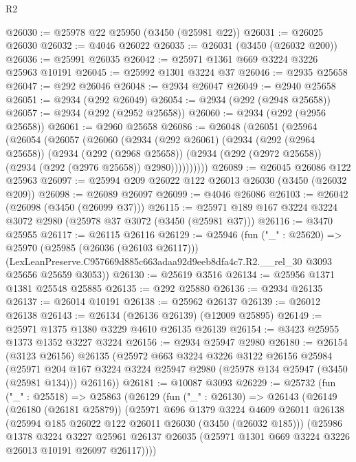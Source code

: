 \begin{lexlean}{R2}
\begin{coremodule}
@26030 := @25978 @22 @25950 (@3450 (@25981 @22))
@26031 := @26025 @26030
@26032 := @4046 @26022
@26035 := @26031 (@3450 (@26032 @200))
@26036 := @25991 @26035
@26042 := @25971 @1361 @669 @3224 @3226 @25963 @10191
@26045 := @25992 @1301 @3224 @37
@26046 := @2935 @25658
@26047 := @292 @26046
@26048 := @2934 @26047
@26049 := @2940 @25658
@26051 := @2934 (@292 @26049)
@26054 := @2934 (@292 (@2948 @25658))
@26057 := @2934 (@292 (@2952 @25658))
@26060 := @2934 (@292 (@2956 @25658))
@26061 := @2960 @25658
@26086 := @26048
    (@26051
      (@25964
        (@26054
          (@26057
            (@26060
              (@2934
                (@292 @26061)
                (@2934
                  (@292 (@2964 @25658))
                  (@2934
                    (@292 (@2968 @25658))
                    (@2934 (@292 (@2972 @25658)) (@2934 (@292 (@2976 @25658)) @2980))))))))))
@26089 := @26045 @26086 @122 @25963
@26097 := @25994 @209 @26022 @122 @26013 @26030 (@3450 (@26032 @209))
@26098 := @26089 @26097
@26099 := @4046 @26086
@26103 := @26042 (@26098 (@3450 (@26099 @37)))
@26115 := @25971 @189 @167 @3224 @3224 @3072 @2980 (@25978 @37 @3072 (@3450 (@25981 @37)))
@26116 := @3470 @25955
@26117 := @26115 @26116
@26129 := @25946
    (fun ("_" : @25620) =>
    @25970
      (@25985 (@26036 (@26103 @26117)))
      (LexLeanPreserve.C957669d885c663adaa92d9eeb8dfa4c7.R2.__rel_30 @3093 @25656 @25659 @3053))
@26130 := @25619 @3516
@26134 := @25956 @1371 @1381 @25548 @25885
@26135 := @292 @25880
@26136 := @2934 @26135
@26137 := @26014 @10191
@26138 := @25962 @26137
@26139 := @26012 @26138
@26143 := @26134 (@26136 @26139) (@12009 @25895)
@26149 := @25971 @1375 @1380 @3229 @4610 @26135 @26139
@26154 := @3423 @25955 @1373 @1352 @3227 @3224
@26156 := @2934 @25947 @2980
@26180 := @26154
    (@3123 @26156)
    @26135
    (@25972
      @663
      @3224
      @3226
      @3122
      @26156
      @25984
      (@25971 @204 @167 @3224 @3224 @25947 @2980 (@25978 @134 @25947 (@3450 (@25981 @134))) @26116))
@26181 := @10087 @3093
@26229 := @25732
    (fun ("_" : @25518) =>
    @25863
      (@26129
        (fun ("_" : @26130) =>
        @26143
          (@26149
            (@26180 (@26181 @25879))
            (@25971
              @696
              @1379
              @3224
              @4609
              @26011
              @26138
              (@25994 @185 @26022 @122 @26011 @26030 (@3450 (@26032 @185)))
              (@25986
                @1378
                @3224
                @3227
                @25961
                @26137
                @26035
                (@25971 @1301 @669 @3224 @3226 @26013 @10191 @26097 @26117))))

\end{coremodule}
\end{lexlean}
